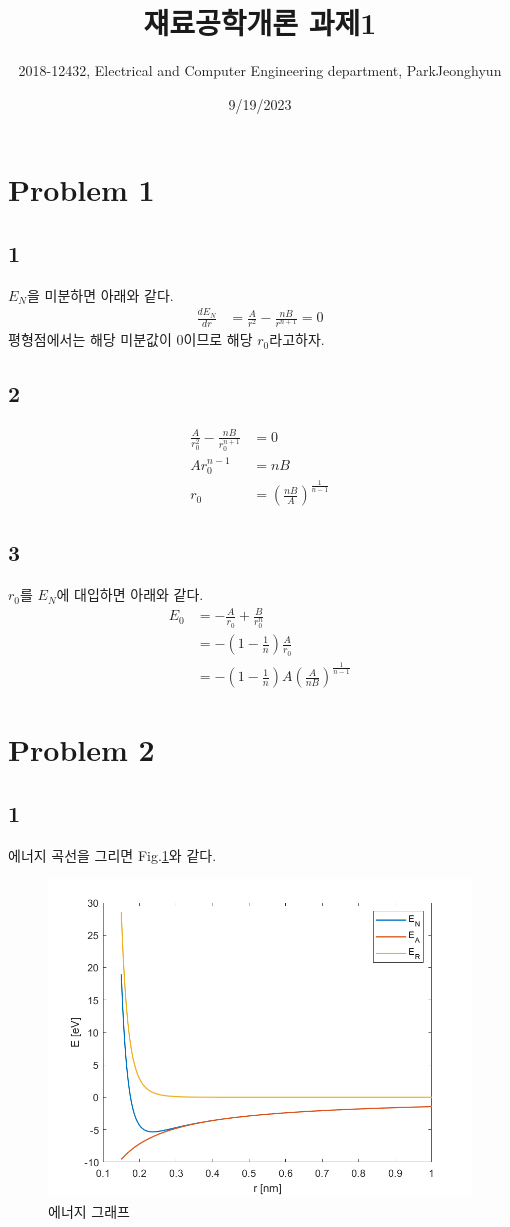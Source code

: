 \documentclass[a4paper]{oblivoir}
\title{쟤료공학개론 과제1}
\author{2018-12432, Electrical and Computer Engineering department, ParkJeonghyun}
\date{9/19/2023}
\begin{document}
\maketitle
\section{Problem 1}
\subsection{1}
\indent $E_{N}$을 미분하면 아래와 같다.
\begin{align}
	\frac{dE_{N}}{dr} &= \frac{A}{r^{2}} - \frac{nB}{r^{n+1}} = 0
\end{align}
평형점에서는 해당 미분값이 0이므로 해당 $r_{0}$라고하자.
\subsection{2}
\begin{align}
	\frac{A}{r_{0}^{2}} - \frac{nB}{r_{0}^{n+1}} &= 0\\
	Ar_{0}^{n-1}&=nB\\
	r_{0} &= \left(\frac{nB}{A}\right)^{\frac{1}{n-1}}\label{eq:r0}
\end{align}
\subsection{3}
$r_{0}$를 $E_{N}$에 대입하면 아래와 같다.
\begin{align}
	E_{0} &= -\frac{A}{r_{0}} + \frac{B}{r_{0}^{n}}\\
	&= -\left( 1- \frac{1}{n} \right)\frac{A}{r_{0}}\\
	&= -\left( 1- \frac{1}{n} \right)A\left(\frac{A}{nB}\right)^{\frac{1}{n-1}}\label{eq:E0}
\end{align}


\section{Problem 2}
\subsection{1}
에너지 곡선을 그리면 Fig.\ref{fig:P2_1}와 같다.

\begin{figure}[htbp]
	\centerline{\includegraphics[width = 0.6\linewidth]{P2_1.png}}%
	\caption{\label{fig:P2_1}에너지 그래프}
\end{figure}
\end{document}
